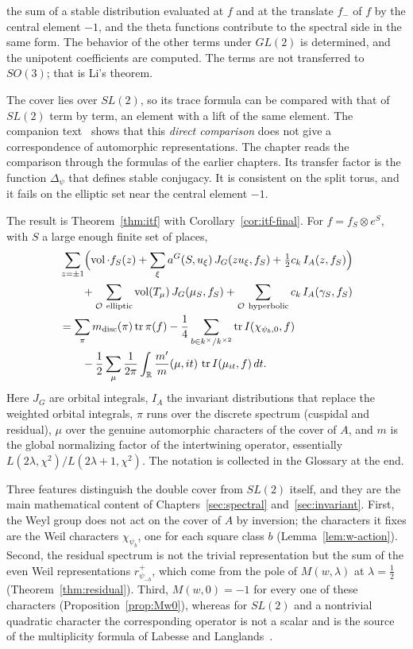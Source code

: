 \begin{description}
  the sum of a stable distribution evaluated at $f$ and at the translate
  $f_-$ of $f$ by the central element $-1$, and the theta functions
  contribute to the spectral side in the same form. The behavior of the
  other terms under $GL(2)$ is determined, and the unipotent coefficients
  are computed. The terms are not transferred to $SO(3)$; that is Li's
  theorem.
\item[Comparison with $SL(2)$ (Chapter~\ref{sec:compare}).] The cover
  lies over $SL(2)$, so its trace formula can be compared with that of
  $SL(2)$ term by term, an element with a lift of the same element. The
  companion text~\cite{JC26} shows that this \emph{direct comparison}
  does not give a correspondence of automorphic representations. The
  chapter reads the comparison through the formulas of the earlier
  chapters. Its transfer factor is the function $\Delta_\psi$ that
  defines stable conjugacy. It is consistent on the split torus, and it
  fails on the elliptic set near the central element $-1$.
\end{description}

The result is Theorem~\ref{thm:itf} with Corollary~\ref{cor:itf-final}.
For $f=f_S\otimes e^S$, with $S$ a large enough finite set of places,
\begin{align*}
&\sum_{z=\pm1}\Bigl(\vol\cdot f_S(z)+\sum_{\xi}a^G(S,u_\xi)\,
J_G(zu_\xi,f_S)+\tfrac12c_k\,I_A(z,f_S)\Bigr)\\
&\qquad+\sum_{\mathcal O\ \mathrm{elliptic}}\vol(T_\mu)\,J_G(\mu_S,f_S)
+\sum_{\mathcal O\ \mathrm{hyperbolic}}c_k\,I_A(\gamma_S,f_S)\\
&=\sum_\pi m_{\mathrm{disc}}(\pi)\operatorname{tr}\pi(f)
-\frac14\sum_{b\in k^\times/k^{\times2}}\operatorname{tr}I(\chi_{\psi_b,0},f)\\
&\qquad-\frac12\sum_\mu\frac1{2\pi}\int_\R\frac{m'}m(\mu,it)\,\operatorname{tr}
I(\mu_{it},f)\,dt .
\end{align*}
Here $J_G$ are orbital integrals, $I_A$ the invariant distributions that
replace the weighted orbital integrals, $\pi$ runs over the discrete
spectrum (cuspidal and residual), $\mu$ over the genuine automorphic
characters of the cover of $A$, and $m$ is the global normalizing factor
of the intertwining operator, essentially
$L(2\lambda,\chi^2)/L(2\lambda+1,\chi^2)$. The notation is collected in
the Glossary at the end.

Three features distinguish the double cover from $SL(2)$ itself, and they
are the main mathematical content of Chapters~\ref{sec:spectral}
and~\ref{sec:invariant}. First, the Weyl group does not act on the cover
of $A$ by inversion; the characters it fixes are the Weil characters
$\chi_{\psi_b}$, one for each square class $b$
(Lemma~\ref{lem:w-action}). Second, the residual spectrum is not the
trivial representation but the sum of the even Weil representations
$r^+_{\psi_{-b}}$, which come from the pole of $M(w,\lambda)$ at
$\lambda=\frac12$ (Theorem~\ref{thm:residual}). Third, $M(w,0)=-1$ for
every one of these characters (Proposition~\ref{prop:Mw0}), whereas for
$SL(2)$ and a nontrivial quadratic character the corresponding operator
is not a scalar and is the source of the multiplicity formula of Labesse
and Langlands~\cite{LL79}.

